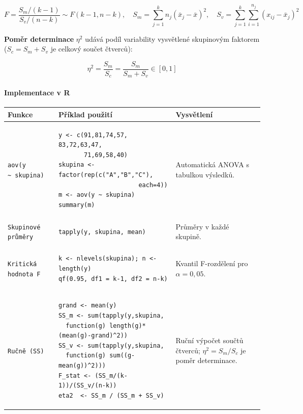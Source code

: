 \documentclass[a4paper, 11pt]{article}
\newenvironment{funkcedict}
{%
  \begingroup
  \renewcommand{\arraystretch}{1.4}%
  \lstset{basicstyle=\ttfamily\small, columns=fullflexible}%
  \setlength{\tabcolsep}{4pt}%
  \begin{tabular}{p{0.19\textwidth} p{0.38\textwidth} p{0.30\textwidth}}
  \textbf{Funkce} & \textbf{Příklad použití} & \textbf{Vysvětlení} \\
  \midrule
}
{%
  \end{tabular}%
  \endgroup
}
\begin{document}
\begin{equation*}
	F = \frac{S_m/(k-1)}{S_v/(n-k)} \sim F(k-1, n-k), \quad
	S_m = \sum_{j=1}^k n_j(\bar{x}_j - \bar{x})^2, \quad
	S_v = \sum_{j=1}^k \sum_{i=1}^{n_j} (x_{ij} - \bar{x}_j)^2
\end{equation*}

\textbf{Poměr determinace} $\eta^2$ udává podíl variability vysvětlené skupinovým faktorem
($S_c = S_m + S_v$ je celkový součet čtverců):

\begin{equation*}
	\eta^2 = \frac{S_m}{S_c} = \frac{S_m}{S_m + S_v} \in [0, 1]
\end{equation*}

\paragraph{Implementace v R}\mbox{}\par

\begin{funkcedict}

	\texttt{aov(y \textasciitilde\ skupina)} &
	\begin{lstlisting}
y <- c(91,81,74,57, 83,72,63,47,
       71,69,58,40)
skupina <- factor(rep(c("A","B","C"),
                      each=4))
m <- aov(y ~ skupina)
summary(m)
	\end{lstlisting}
	&
	Automatická ANOVA s tabulkou výsledků. \\

	\texttt{Skupinové průměry} &
	\begin{lstlisting}
tapply(y, skupina, mean)
	\end{lstlisting}
	&
	Průměry v každé skupině. \\

	\texttt{Kritická hodnota F} &
	\begin{lstlisting}
k <- nlevels(skupina); n <- length(y)
qf(0.95, df1 = k-1, df2 = n-k)
	\end{lstlisting}
	&
	Kvantil F-rozdělení pro $\alpha = 0{,}05$. \\

	\texttt{Ručně (SS)} &
	\begin{lstlisting}
grand <- mean(y)
SS_m <- sum(tapply(y,skupina,
  function(g) length(g)*(mean(g)-grand)^2))
SS_v <- sum(tapply(y,skupina,
  function(g) sum((g-mean(g))^2)))
F_stat <- (SS_m/(k-1))/(SS_v/(n-k))
eta2  <- SS_m / (SS_m + SS_v)
	\end{lstlisting}
	&
	Ruční výpočet součtů čtverců; $\eta^2 = S_m / S_c$ je poměr determinace. \\

\end{funkcedict}
\end{document}
